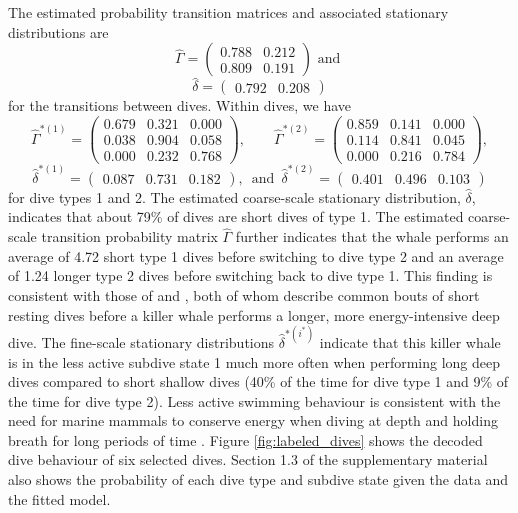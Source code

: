 The estimated probability transition matrices and associated stationary distributions are
%
$$\hat \Gamma = \begin{pmatrix} 
0.788 & 0.212 \\
0.809 & 0.191
\end{pmatrix} \text{ and }$$
$$\hat \delta = \begin{pmatrix} 0.792 & 0.208 \end{pmatrix}$$
%
for the transitions between dives. Within dives, we have
$$\hat \Gamma^{*(1)} = \begin{pmatrix} 
0.679 & 0.321 & 0.000 \\
0.038 & 0.904 & 0.058 \\
0.000 & 0.232 & 0.768
\end{pmatrix}, \qquad 
\hat \Gamma^{*(2)} = \begin{pmatrix} 
0.859 & 0.141 & 0.000 \\
0.114 & 0.841 & 0.045 \\
0.000 & 0.216 & 0.784
\end{pmatrix},$$
$$\hat \delta^{*(1)} = \begin{pmatrix} 0.087 & 0.731 & 0.182 \end{pmatrix}, \enspace \text{and} \enspace \hat \delta^{*(2)} = \begin{pmatrix} 0.401 & 0.496 & 0.103 \end{pmatrix}$$
%
for dive types 1 and 2.
The estimated coarse-scale stationary distribution, $\hat{\delta}$, indicates that about 79\% of dives are short dives of type 1. The estimated coarse-scale transition probability matrix $\hat \Gamma$ further indicates that the whale performs an average of 4.72 short type 1 dives before switching to dive type 2 and an average of 1.24 longer type 2 dives before switching back to dive type 1. This finding is consistent with those of \citet{Tennessen:2019b} and \citet{Williams:2009}, both of whom describe common bouts of short resting dives before a killer whale performs a longer, more energy-intensive deep dive. The fine-scale stationary distributions $\hat{\delta}^{*(i^*)}$ indicate that this killer whale is in the less active subdive state 1 much more often when performing long deep dives compared to short shallow dives (40\% of the time for dive type 1 and 9\% of the time for dive type 2). Less active swimming behaviour is consistent with the need for marine mammals to conserve energy when diving at depth and holding breath for long periods of time \citep{Williams:1999,Hastie:2006}. Figure \ref{fig:labeled_dives} shows the decoded dive behaviour of six selected dives. Section 1.3 of the supplementary material also shows the probability of each dive type and subdive state given the data and the fitted model.

